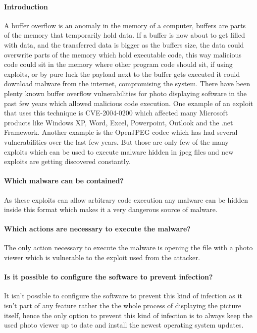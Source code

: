 \documentclass[a4paper,10pt]{article}
\begin{document}
\paragraph*{Introduction}
A buffer overflow is an anomaly in the memory of a computer, buffers are parts of the memory that temporarily hold data. If a buffer is now about to get filled with data, and the transferred data is bigger as the buffers size, the data could overwrite parts of the memory which hold executable code, this way malicious code could sit in the memory where other program code should sit, if using exploits, or by pure luck the payload next to the buffer gets executed it could download malware from the internet, compromising the system. There have been plenty known buffer overflow vulnerabilities for photo displaying software in the past few years which allowed malicious code execution. One example of an exploit that uses this technique is CVE-2004-0200 which affected many Microsoft products like Windows XP, Word, Excel, Powerpoint, Outlook and the .net Framework. Another example is the OpenJPEG codec which has had several vulnerabilities over the last few years.\cite{openjpeg:securityvulnerabilities} But those are only few of the many exploits which can be used to execute malware hidden in jpeg files and new exploits are getting discovered constantly.
\paragraph*{Which malware can be contained?}
As these exploits can allow arbitrary code execution any malware can be hidden inside this format which makes it a very dangerous source of malware.
\paragraph*{Which actions are necessary to execute the malware?}
The only action necessary to execute the malware is opening the file with a photo viewer which is vulnerable to the exploit used from the attacker.
\paragraph*{Is it possible to configure the software to prevent infection?}
It isn't possible to configure the software to prevent this kind of infection as it isn't part of any feature rather the the whole process of displaying the picture itself, hence the only option to prevent this kind of infection is to always keep the used photo viewer up to date and install the newest operating system updates.
\end{document}
